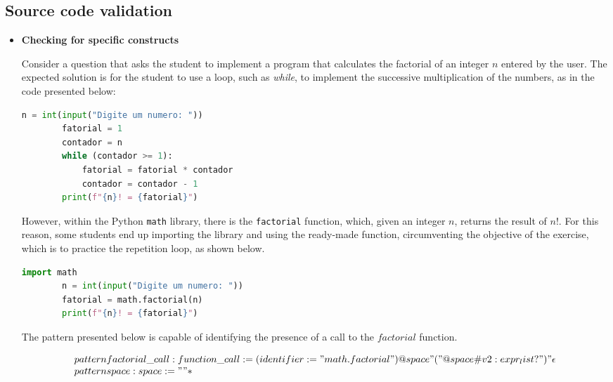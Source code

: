 \subsection{Source code validation}


\begin{itemize}
    \item \textbf{Checking for specific constructs}
    
    Consider a question that asks the student to implement a program that 
    calculates the factorial of an integer \(n\) entered by the user.
    The expected solution is for the student to use a loop, such as \textit{while}, 
    to implement the successive multiplication of the numbers, as in the code 
    presented below:
    
    \begin{lstlisting}[language=Python]
        n = int(input("Digite um numero: "))
        fatorial = 1
        contador = n
        while (contador >= 1):
            fatorial = fatorial * contador
            contador = contador - 1
        print(f"{n}! = {fatorial}")
    \end{lstlisting}
    
    However, within the Python \texttt{math} library, there is the \texttt{factorial} 
    function, which, given an integer \(n\), returns the result of \(n!\).
    For this reason, some students end up importing the library and using the 
    ready-made function, circumventing the objective of the exercise, which is 
    to practice the repetition loop, as shown below.
    
    \begin{lstlisting}[language=Python]
        import math
        n = int(input("Digite um numero: "))
        fatorial = math.factorial(n)
        print(f"{n}! = {fatorial}")
    \end{lstlisting}
    
    
    The pattern presented below is capable of identifying the presence of a call 
    to the \(factorial\) function.
    
    \[
        \begin{array}{l}
            pattern factorial\_call : function\_call := (identifier := "math.factorial") @space "(" @space \#v2:expr_list? ")" \epsilon \\
            pattern space : space := " "*
            

\end{array}\]
\end{itemize}
